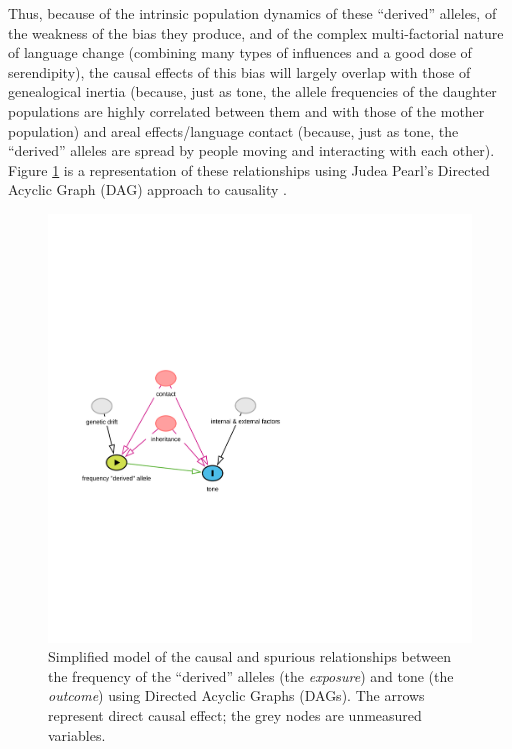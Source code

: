 \documentclass[twoside,twocolumn]{article}
\begin{document}
Thus, because of the intrinsic population dynamics of these ``derived'' alleles, of the weakness of the bias they produce, and of the complex multi-factorial nature of language change (combining many types of influences and a good dose of serendipity), the causal effects of this bias will largely overlap with those of genealogical inertia (because, just as tone, the allele frequencies of the daughter populations are highly correlated between them and with those of the mother population) and areal effects/language contact (because, just as tone, the ``derived'' alleles are spread by people moving and interacting with each other).
Figure \ref{Fig:dag_tone_genes} is a representation of these relationships using Judea Pearl's Directed Acyclic Graph (DAG) approach to causality \citep{pearl_causality_2000,pearl_why_2018,mcelreath_statistical_2020}.

\begin{figure}[h]
  \centering
  \includegraphics[width=\linewidth]{dag_tone_genes}
  \caption{Simplified model of the causal and spurious relationships between the frequency of the ``derived'' alleles (the \textit{exposure}) and tone (the \textit{outcome}) using Directed Acyclic Graphs (DAGs). The arrows represent direct causal effect; the grey nodes are unmeasured variables.}
  \label{Fig:dag_tone_genes}
\end{figure}
\end{document}
